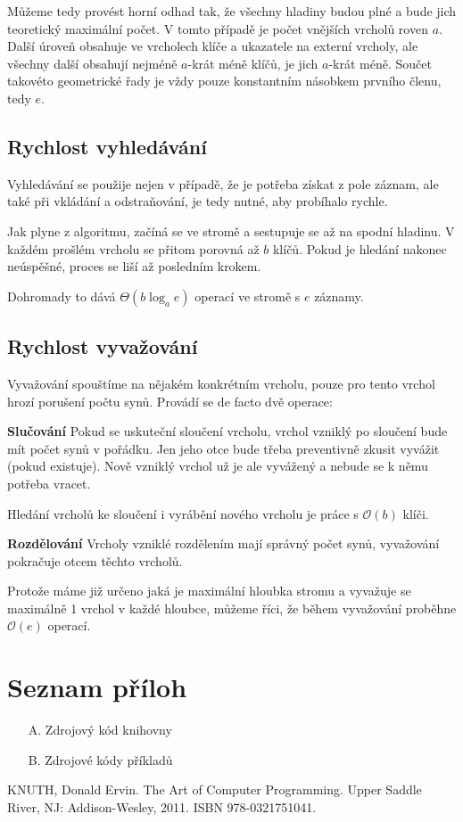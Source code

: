 \documentclass[a4paper,11pt,openany]{article}
\begin{document}
Můžeme tedy provést horní odhad tak, že všechny hladiny budou plné a bude jich teoretický maximální počet. V tomto případě je počet vnějších vrcholů roven $a$. Další úroveň obsahuje ve vrcholech klíče a ukazatele na externí vrcholy, ale všechny další obsahují nejméně $a$-krát méně klíčů, je jich $a$-krát méně. Součet takovéto geometrické řady je vždy pouze konstantním násobkem prvního členu, tedy $e$.

\subsection{Rychlost vyhledávání}

Vyhledávání se použije nejen v případě, že je potřeba získat z pole záznam, ale také při vkládání a odstraňování, je tedy nutné, aby probíhalo rychle. 

Jak plyne z algoritmu, začíná se ve stromě a sestupuje se až na spodní hladinu. V každém prošlém vrcholu se přitom porovná až $b$ klíčů. Pokud je hledání nakonec neúspěšné, proces se liší až posledním krokem.

Dohromady to dává $ \Theta(b\log_a e) $ operací ve stromě s $e$ záznamy.

\subsection{Rychlost vyvažování}

Vyvažování spouštíme na nějakém konkrétním vrcholu, pouze pro tento vrchol hrozí porušení počtu synů. Provádí se de facto dvě operace:

\textbf{Slučování} Pokud se uskuteční sloučení vrcholu, vrchol vzniklý po sloučení bude mít počet synů v pořádku. Jen jeho otce bude třeba preventivně zkusit vyvážit (pokud existuje). Nově vzniklý vrchol už je ale vyvážený a nebude se k němu potřeba vracet.

Hledání vrcholů ke sloučení i vyrábění nového vrcholu je práce s $ \mathcal{O}(b) $ klíči.

\textbf{Rozdělování} Vrcholy vzniklé rozdělením mají správný počet synů, vyvažování pokračuje otcem těchto vrcholů.

Protože máme již určeno jaká je maximální hloubka stromu a vyvažuje se maximálně 1 vrchol v každé hloubce, můžeme říci, že během vyvažování proběhne $ \mathcal{O}(e) $ operací.

\listoffigures
\listoftables
\section*{Seznam příloh}
\begin{enumerate}
	\item[A.] Zdrojový kód knihovny
	\item[B.] Zdrojové kódy příkladů
\end{enumerate}
\begin{thebibliography}{10}
	KNUTH, Donald Ervin. The Art of Computer Programming. Upper Saddle River, NJ: Addison-Wesley, 2011. ISBN 978-0321751041.
\end{thebibliography}
\end{document}
